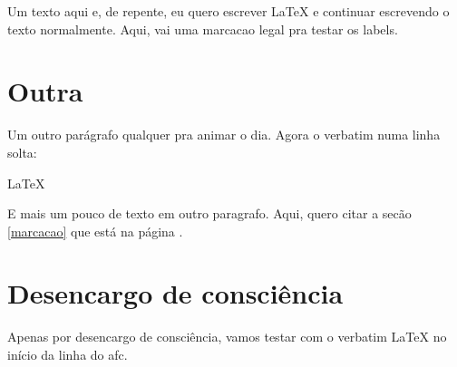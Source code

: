 \documentclass[a4paper, 11pt, oneside]{book}
\begin{document}
Um texto aqui e, de repente, eu quero escrever \LaTeX{} e continuar escrevendo o texto normalmente. Aqui, vai uma \label{marcacao}marcacao legal pra testar os labels.
\section{Outra}			


Um outro parágrafo qualquer pra animar o dia. Agora o verbatim numa linha solta:


\LaTeX{}


E mais um pouco de texto em outro paragrafo. Aqui, quero citar a secão \ref{marcacao} que está na página \pageref{marcacao}.
\section{Desencargo de consciência}			


Apenas por desencargo de consciência, vamos testar com o verbatim 
\LaTeX{} no início da linha do afc.





\clearemptydoublepage
{}
\printindex
\end{document}

